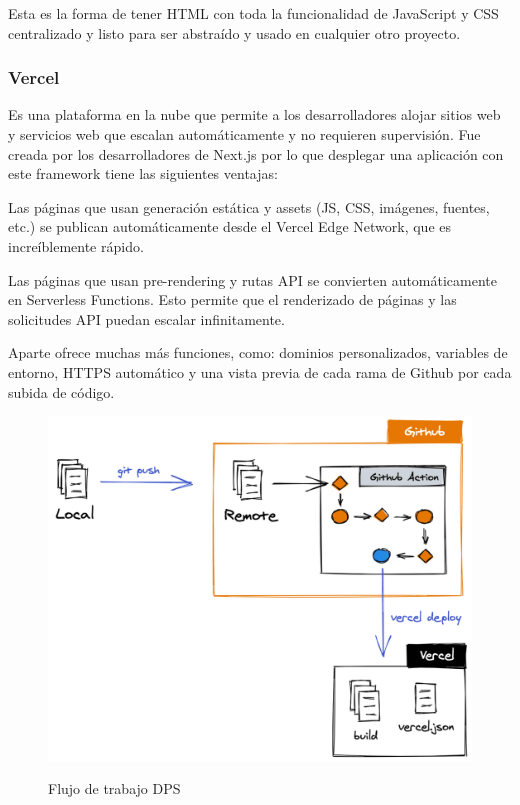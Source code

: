 \documentclass[12pt,twoside,titlepage]{report}
\begin{document}
Esta es la forma de tener HTML con toda la funcionalidad de JavaScript y CSS centralizado y listo para ser abstraído y usado en cualquier otro proyecto.

\subsubsection{Vercel}

Es una plataforma en la nube que permite a los desarrolladores alojar sitios web y servicios web que escalan automáticamente y no requieren supervisión. Fue creada por los desarrolladores de Next.js por lo que desplegar una aplicación con este framework tiene las siguientes ventajas:

\begin{compactitem}
    \item Las páginas que usan generación estática y assets (JS, CSS, imágenes, fuentes, etc.) se publican automáticamente desde el Vercel Edge Network, que es increíblemente rápido.
    \item Las páginas que usan pre-rendering y rutas API se convierten automáticamente en Serverless Functions. Esto permite que el renderizado de páginas y las solicitudes API puedan escalar infinitamente.
\end{compactitem}

Aparte ofrece muchas más funciones, como: dominios personalizados, variables de entorno, HTTPS automático y una vista previa de cada rama de Github por cada subida de código.

\begin{figure}[H]
    \centering
    \includegraphics[scale=0.2]{vercel_workflow}
    \label{fig:vercel_workflow}
    \caption{Flujo de trabajo DPS}
\end{figure}
\end{document}
